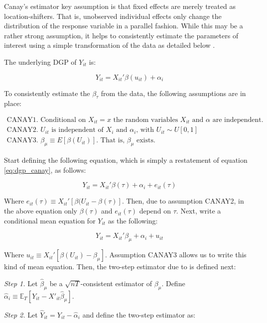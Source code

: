 \documentclass[bib]{statapress}
\begin{document}
Canay's estimator key assumption is that fixed effects are merely
treated as location-shifters. That is, unobserved individual effects
only change the distribution of the response variable in a parallel
fashion. While this may be a rather strong assumption, it helps to
consistently estimate the parameters of interest using a simple
transformation of the data as detailed below \citep{canay2011}.

The underlying DGP of \(Y_{it}\) is:

\[\label{eq:dgp_canay}
    Y_{it} = X_{it}' \beta(u_{it}) + \alpha_i\]

To consistently estimate the \(\beta_{\tau}\) from the data, the
following assumptions are in place:

\[\begin{gathered}
    \text{CANAY1. Conditional on $X_{it} = x$ the random variables $X_{it}$ and $\alpha$ are independent.} \\
    \text{CANAY2. $U_{it}$ is independent of $X_i$ and $\alpha_i$, with $U_{it} \sim U[0,1]$} \\
    \text{CANAY3. $\beta_{\mu} \equiv E[\beta(U_{it})]$. That is, $\beta_{\mu}$ exists.}
\end{gathered}\]

Start defining the following equation, which is simply a restatement of
equation \hyperref[eq:dgp_canay]{{[}eq:dgp\_canay{]}}, as follows:

\[\label{eq:canay_2.3}
Y_{it} = X_{it}' \beta(\tau) + \alpha_i + e_{it}(\tau)\]

Where \(e_{it}(\tau) \equiv X_{it}'[\beta(U_{it} - \beta(\tau)]\). Then,
due to assumption CANAY2, in the above equation only \(\beta(\tau)\) and
\(e_{it}(\tau)\) depend on \(\tau\). Next, write a conditional mean
equation for \(Y_{it}\) as the following:

\[\label{eq:canay_meaneq}
    Y_{it} = X_{it}' \beta_{\mu} + \alpha_i + u_{it}\]

Where \(u_{it} \equiv X_{it}' [\beta(U_{it}) - \beta_{\mu}]\).
Assumption CANAY3 allows us to write this kind of mean equation. Then,
the two-step estimator due to \citep{canay2011} is defined next:

\emph{Step 1.} Let \(\hat{\beta}_\mu\) be a \(\sqrt{nT}\)-consistent
estimator of \(\beta_{\mu}\). Define
\(\hat{\alpha}_i \equiv \mathbb{E}_T[Y_{it} - X'_{it}\hat{\beta}_{\mu}]\).

\emph{Step 2.} Let \(\hat{Y}_{it} = Y_{it} - \hat{\alpha}_i\) and define
the two-step estimator as:
\end{document}
